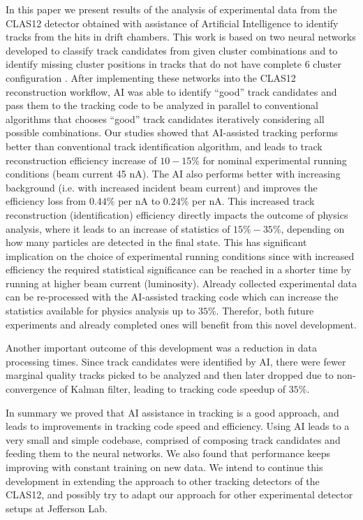 In this paper we present results of the analysis of experimental data from the CLAS12 detector obtained with assistance of Artificial Intelligence
to identify tracks from the hits in drift chambers. This work is based on two neural networks developed to classify track candidates from
given cluster combinations \cite{Gavalian:2020oxg} and to identify missing cluster positions in tracks that do not have complete 6 cluster configuration \cite{Gavalian:2020xmc}. After implementing these networks into the CLAS12 reconstruction workflow, AI was able to identify ``good'' track candidates 
and pass them to the tracking code to be analyzed in parallel to conventional algorithms that chooses ``good'' track candidates iteratively considering all possible combinations. 
Our studies showed that AI-assisted tracking performs better than conventional track identification algorithm, and leads to track reconstruction efficiency increase of $10-15\%$ for nominal experimental running conditions (beam current 45 nA). The AI also performs better with increasing background (i.e. with increased incident beam current) and improves the efficiency loss from $0.44\%$ per nA to $0.24\%$ per nA.
This increased track reconstruction (identification) efficiency directly impacts the outcome of physics analysis, where it leads to an increase of statistics of 
$15\%-35\%$, depending on how many particles are detected in the final state. This has significant implication on  the choice of experimental running conditions since with increased efficiency the required statistical significance can be reached in a shorter time by running at higher beam current (luminosity). Already collected experimental data can be re-processed with the AI-assisted tracking
code which can increase the statistics available for physics analysis up to $35\%$. Therefor, both future experiments and already completed ones will benefit 
from this novel development.

Another important outcome of this development was a reduction in data processing times. Since track candidates were identified by AI, there were fewer marginal quality tracks picked to be analyzed and then later dropped due to non-convergence of Kalman filter, leading to tracking code speedup  of $35\%$.

In summary we proved that AI assistance in tracking is a good approach, and leads to improvements in tracking code speed and efficiency. 
Using AI leads to a very small and simple codebase, comprised of composing track candidates and feeding them to the neural networks. 
We also found that performance keeps improving with constant training on new data. We intend to continue this development in extending 
the approach to other tracking detectors of the CLAS12, and possibly try to adapt  our approach for other experimental detector setups at Jefferson Lab.


